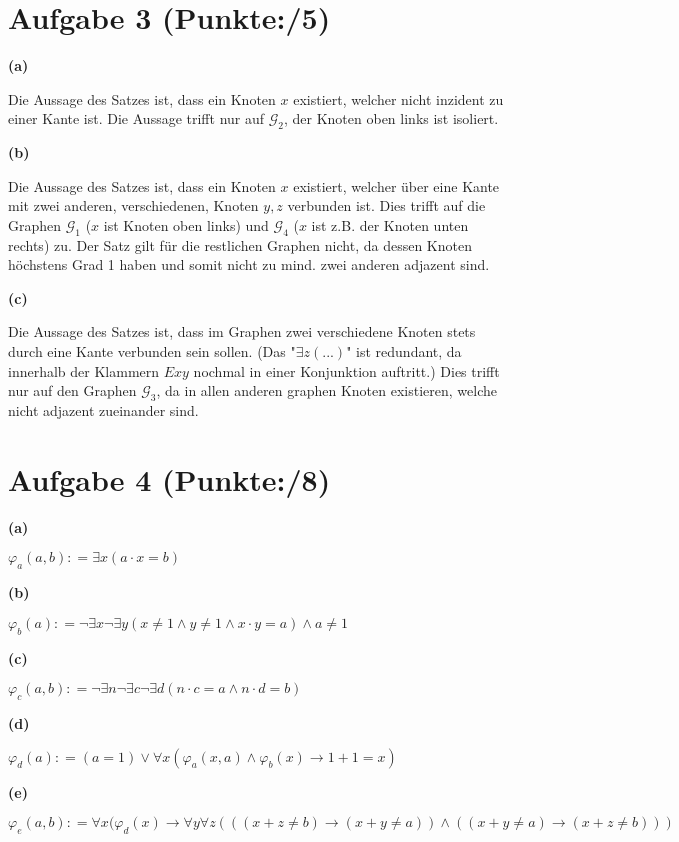 \documentclass[11pt, a4paper]{article}
\newcommand{\pp}{5}
\newcommand{\ppp}{8}
\newcommand{\defgr}{\mathrel{\mathop:\!\!=}}
\begin{document}
\section*{Aufgabe 3 (Punkte:\qquad/\pp)}
\textbf{(a)}
\begin{adjustwidth}{20pt}{20pt}
	Die Aussage des Satzes ist, dass ein Knoten $x$ existiert, welcher nicht inzident zu einer Kante ist. Die Aussage trifft nur auf $\mathcal{G}_2$, der Knoten oben links ist isoliert.
\end{adjustwidth}
\textbf{(b)}
\begin{adjustwidth}{20pt}{20pt}
	Die Aussage des Satzes ist, dass ein Knoten $x$ existiert, welcher über eine Kante mit zwei anderen, verschiedenen, Knoten $y,z$ verbunden ist. Dies trifft auf die Graphen
	 $\mathcal{G}_1$ ($x$ ist Knoten oben links) und  $\mathcal{G}_4$ ($x$ ist z.B. der Knoten unten rechts) zu. Der Satz gilt für die restlichen Graphen nicht, da dessen Knoten
	höchstens Grad 1 haben und somit nicht zu mind. zwei anderen adjazent sind.
\end{adjustwidth}
\textbf{(c)}
\begin{adjustwidth}{20pt}{20pt}
	Die Aussage des Satzes ist, dass im Graphen zwei verschiedene Knoten stets durch eine Kante verbunden sein sollen. (Das "$\exists z(...)$" ist redundant, da innerhalb der Klammern
	$Exy$ nochmal in einer Konjunktion auftritt.) Dies trifft nur auf den Graphen  $\mathcal{G}_3$, da in allen anderen graphen Knoten existieren, welche nicht adjazent zueinander sind.
\end{adjustwidth}



\section*{Aufgabe 4 (Punkte:\qquad/\ppp)}
\textbf{(a)}
\begin{adjustwidth}{20pt}{20pt}
	$\varphi_{a}(a,b) \defgr \exists x(a \cdot x = b)$
\end{adjustwidth}
\textbf{(b)}
\begin{adjustwidth}{20pt}{20pt}
	$\varphi_{b}(a) \defgr \neg\exists x \neg\exists y(x \neq 1 \wedge y \neq 1 \wedge x \cdot y = a) \wedge a \neq 1$
\end{adjustwidth}
\textbf{(c)}
\begin{adjustwidth}{20pt}{20pt}
	$\varphi_{c}(a,b) \defgr \neg\exists n \neg\exists c \neg\exists d(n \cdot c = a \wedge n \cdot d = b)$
\end{adjustwidth}
\textbf{(d)}
\begin{adjustwidth}{20pt}{20pt}
	$\varphi_{d}(a) \defgr (a=1) \vee \forall x (\varphi_a(x,a) \wedge \varphi_b(x) \rightarrow 1+1=x)$
\end{adjustwidth}
\textbf{(e)}
\begin{adjustwidth}{20pt}{20pt}
	$\varphi_{e}(a,b) \defgr \forall x (\varphi_d(x) \rightarrow \forall y \forall z (((x+z \neq b) \rightarrow (x + y \neq a)) \wedge ((x+y\neq a) \rightarrow (x+z \neq b)))$
\end{adjustwidth}
\end{document}
